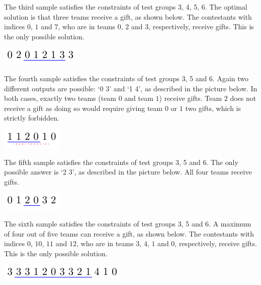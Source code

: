 The third sample satisfies the constraints of test groups 3, 4, 5, 6. The optimal solution is that three teams receive a gift, as shown below. The contestants with indices $0$, $1$ and $7$, who are in teams $0$, $2$ and $3$, respectively, receive gifts. This is the only possible solution.


\begin{center}
\includegraphics[width=0.8\linewidth]{sample3.pdf}
\end{center}


The fourth sample satisfies the constraints of test groups 3, 5 and 6. Again two different outputs are possible: `0 3' and `1 4', as described in the picture below. In both cases, exactly two teams (team $0$ and team $1$) receive gifts. Team $2$ does not receive a gift as doing so would require giving team $0$ or $1$ two gifts, which is strictly forbidden.


\begin{center}
\includegraphics[width=0.8\linewidth]{sample4.pdf}
\end{center}


The fifth sample satisfies the constraints of test groups 3, 5 and 6. The only possible answer is `2 3', as described in the picture below. All four teams receive gifts.


\begin{center}
\includegraphics[width=0.8\linewidth]{sample5.pdf}
\end{center}


The sixth sample satisfies the constraints of test groups 3, 5 and 6. A maximum of four out of five teams can receive a gift, as shown below. The contestants with indices $0$, $10$, $11$ and $12$, who are in teams $3$, $4$, $1$ and $0$, respectively, receive gifts. This is the only possible solution.


\begin{center}
\includegraphics[width=0.8\linewidth]{sample6.pdf}
\end{center}

